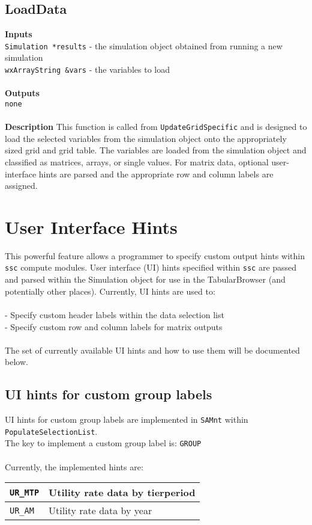 \documentclass[11pt]{article} %
\begin{document}
\subsection{LoadData}
\textbf{Inputs} \\
\texttt{Simulation *results} - the simulation object obtained from running a new simulation\\
\texttt{wxArrayString \&vars} - the variables to load \\
\\
\textbf{Outputs}\\
\texttt{none} \\
\\
\textbf{Description}
This function is called from \texttt{UpdateGridSpecific} and is designed to load the selected variables from the simulation object onto the appropriately sized grid and grid table.  The variables are loaded from the simulation object and classified as matrices, arrays, or single values.  For matrix data, optional user-interface hints are parsed and the appropriate row and column labels are assigned.

\section{User Interface Hints}
This powerful feature allows a programmer to specify custom output hints  within \texttt{ssc} compute modules.  User interface (UI) hints specified within \texttt{ssc} are passed and parsed within the Simulation object for use in the TabularBrowser (and potentially other places).  Currently, UI hints are used to: \\
\\
- Specify custom header labels within the data selection list \\
- Specify custom row and column labels for matrix outputs \\
\\
The set of currently available UI hints and how to use them will be documented below.

\subsection{UI hints for custom group labels}
UI hints for custom group labels are implemented in \texttt{SAMnt} within \texttt{PopulateSelectionList}.  
\\
The key to implement a custom group label is: \texttt{GROUP}\\
\\
Currently, the implemented hints are:\\
\begin{tabular}{l | p{13cm}}
\hline
\texttt{UR\_MTP} & Utility rate data by tier\/period \\ \hline
\texttt{UR\_AM} & Utility rate data by year \\ 
\hline
\end{tabular}
\end{document}
